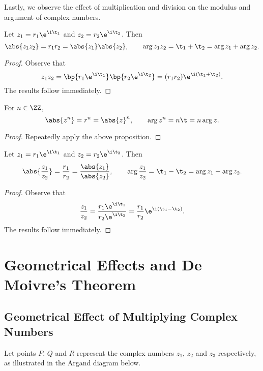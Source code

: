 Lastly, we observe the effect of multiplication and division on the modulus and argument of complex numbers.

\begin{proposition}
    Let $z_1 = r_1 \e^{\i \t_1}$ and $z_2 = r_2 \e^{\i \t_2}$. Then \[\abs{z_1 z_2} = r_1 r_2 = \abs{z_1} \abs{z_2}, \qquad \arg{z_1 z_2} = \t_1 + \t_2 = \arg{z_1} + \arg{z_2}.\]
\end{proposition}
\begin{proof}
    Observe that \[z_1 z_2 = \bp{r_1 \e^{\i \t_1}}\bp{r_2 \e^{\i \t_2}} = (r_1 r_2) \e^{\i (\t_1 + \t_2)}.\] The results follow immediately.
\end{proof}

\begin{corollary}
    For $n \in \ZZ$, \[\abs{z^n} = r^n = \abs{z}^n, \qquad \arg{z^n} = n \t = n \arg{z}.\]
\end{corollary}
\begin{proof}
    Repeatedly apply the above proposition.
\end{proof}

\begin{proposition}
    Let $z_1 = r_1 \e^{\i \t_1}$ and $z_2 = r_2 \e^{\i \t_2}$. Then \[\abs{\frac{z_1}{z_2}} = \frac{r_1}{r_2} = \frac{\abs{z_1}}{\abs{z_2}}, \qquad \arg{\frac{z_1}{z_2}} = \t_1 - \t_2 = \arg{z_1} - \arg{z_2}.\]
\end{proposition}
\begin{proof}
    Observe that \[\frac{z_1}{z_2} = \frac{r_1 \e^{\i \t_1}}{r_2 \e^{\i \t_2}} = \frac{r_1}{r_2} \e^{\i (\t_1 - \t_2)}.\] The results follow immediately.
\end{proof}

\section{Geometrical Effects and De Moivre's Theorem}

\subsection{Geometrical Effect of Multiplying Complex Numbers}

Let points $P$, $Q$ and $R$ represent the complex numbers $z_1$, $z_2$ and $z_3$ respectively, as illustrated in the Argand diagram below.

